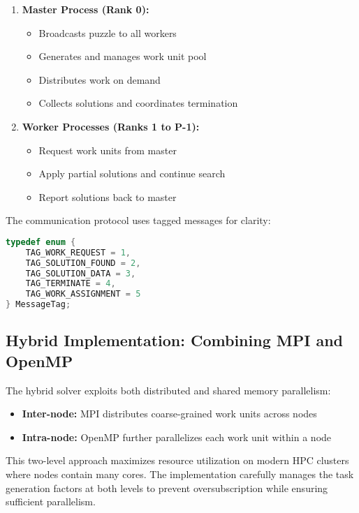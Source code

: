 \documentclass[10pt, conference]{IEEEtran}
\begin{document}
\begin{enumerate}
    \item \textbf{Master Process (Rank 0):}
    \begin{itemize}
        \item Broadcasts puzzle to all workers
        \item Generates and manages work unit pool
        \item Distributes work on demand
        \item Collects solutions and coordinates termination
    \end{itemize}
    
    \item \textbf{Worker Processes (Ranks 1 to P-1):}
    \begin{itemize}
        \item Request work units from master
        \item Apply partial solutions and continue search
        \item Report solutions back to master
    \end{itemize}
\end{enumerate}

The communication protocol uses tagged messages for clarity:

\begin{lstlisting}[language=C, caption=MPI communication tags]
typedef enum {
    TAG_WORK_REQUEST = 1,
    TAG_SOLUTION_FOUND = 2,
    TAG_SOLUTION_DATA = 3,
    TAG_TERMINATE = 4,
    TAG_WORK_ASSIGNMENT = 5
} MessageTag;
\end{lstlisting}

\subsection{Hybrid Implementation: Combining MPI and OpenMP}
The hybrid solver exploits both distributed and shared memory parallelism:

\begin{itemize}
    \item \textbf{Inter-node:} MPI distributes coarse-grained work units across nodes
    \item \textbf{Intra-node:} OpenMP further parallelizes each work unit within a node
\end{itemize}

This two-level approach maximizes resource utilization on modern HPC clusters where nodes contain many cores. The implementation carefully manages the task generation factors at both levels to prevent oversubscription while ensuring sufficient parallelism.
\end{document}
